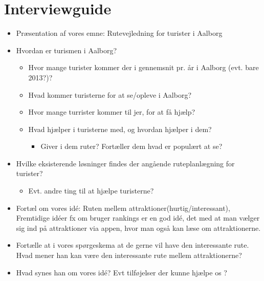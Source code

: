 \chapter{Interviewguide}
\begin{itemize}
\item Præsentation af vores emne: Rutevejledning for turister i Aalborg
\item Hvordan er turismen i Aalborg?
\begin{itemize}
\item Hvor mange turister kommer der i gennemsnit pr. år i Aalborg (evt. bare 2013?)?
\item Hvad kommer turisterne for at se/opleve i Aalborg?
\item Hvor mange turrister kommer til jer, for at få hjælp?
\item Hvad hjælper i turisterne med, og hvordan hjælper i dem?
\begin{itemize}
\item Giver i dem ruter? Fortæller dem hvad er populært at se?
\end{itemize}
\end{itemize}
\item Hvilke eksisterende løsninger findes der angående ruteplanlægning for turister?
\begin{itemize}
\item Evt. andre ting til at hjælpe turisterne?
\end{itemize}
\item Fortæl om vores idé: Ruten mellem attraktioner(hurtig/interessant), Fremtidige idéer fx om bruger rankings er en god idé, det med at man vælger sig ind på attraktioner via appen, hvor man også kan læse om attraktionerne. 
\item Fortælle at i vores spørgeskema at de gerne vil have den interessante rute. Hvad mener han kan være den interessante rute mellem attraktionerne?
\item Hvad synes han om vores idé? Evt tilføjelser der kunne hjælpe os ?

\end{itemize}